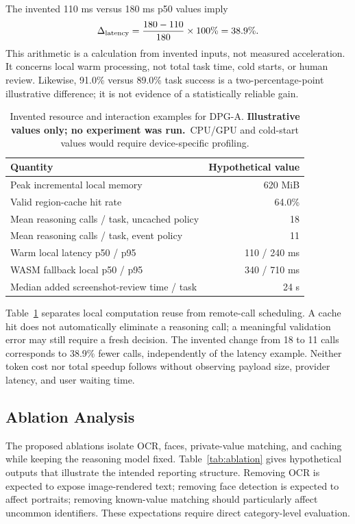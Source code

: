 \documentclass[conference]{IEEEtran}
\newcommand{\illustrative}{\textbf{Illustrative values only; no experiment was run.}}
\begin{document}
The invented 110 ms versus 180 ms p50 values imply
\begin{equation}
 \Delta_{\rm latency}=\frac{180-110}{180}\times100\%=38.9\%.
\end{equation}
This arithmetic is a calculation from invented inputs, not measured acceleration. It concerns local warm processing, not total task time, cold starts, or human review. Likewise, 91.0\% versus 89.0\% task success is a two-percentage-point illustrative difference; it is not evidence of a statistically reliable gain.

\begin{table}[t]
\centering\small
\caption{Invented resource and interaction examples for DPG-A. \illustrative\ CPU/GPU and cold-start values would require device-specific profiling.}
\label{tab:resource}
\begin{tabular}{lr}
\toprule
Quantity & Hypothetical value\\
\midrule
Peak incremental local memory & 620 MiB\\
Valid region-cache hit rate & 64.0\%\\
Mean reasoning calls / task, uncached policy & 18\\
Mean reasoning calls / task, event policy & 11\\
Warm local latency p50 / p95 & 110 / 240 ms\\
WASM fallback local p50 / p95 & 340 / 710 ms\\
Median added screenshot-review time / task & 24 s\\
\bottomrule
\end{tabular}
\end{table}

Table~\ref{tab:resource} separates local computation reuse from remote-call scheduling. A cache hit does not automatically eliminate a reasoning call; a meaningful validation error may still require a fresh decision. The invented change from 18 to 11 calls corresponds to 38.9\% fewer calls, independently of the latency example. Neither token cost nor total speedup follows without observing payload size, provider latency, and user waiting time.

\subsection{Ablation Analysis}
The proposed ablations isolate OCR, faces, private-value matching, and caching while keeping the reasoning model fixed. Table~\ref{tab:ablation} gives hypothetical outputs that illustrate the intended reporting structure. Removing OCR is expected to expose image-rendered text; removing face detection is expected to affect portraits; removing known-value matching should particularly affect uncommon identifiers. These expectations require direct category-level evaluation.
\end{document}

